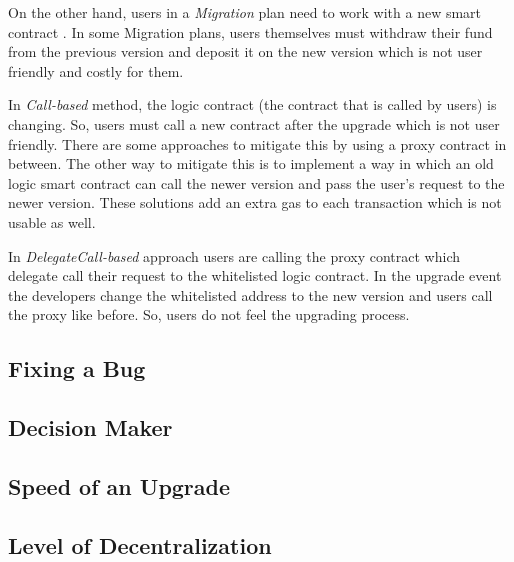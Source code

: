  On the other hand, users in a \textit{Migration} plan need to work with a new smart contract . In some Migration plans, users themselves must withdraw their fund from the previous version and deposit it on the new version which is not user friendly and costly for them.

In \textit{Call-based} method, the logic contract (the contract that is called by users) is changing. So, users must call a new contract after the upgrade which is not user friendly. There are some approaches to mitigate this by using a proxy contract in between. The other way to mitigate this is to implement a way in which an old logic smart contract can call the newer version and pass the user's request to the newer version. These solutions add an extra gas to each transaction which is not usable as well.

In \textit{DelegateCall-based} approach users are calling the proxy contract which delegate call their request to the whitelisted logic contract. In the upgrade event the developers change the whitelisted address to the new version and users call the proxy like before. So, users do not feel the upgrading process.

 \subsection{Fixing a Bug}
 
 \subsection{Decision Maker}
 
 \subsection{Speed of an Upgrade}
 
 \subsection{Level of Decentralization}


